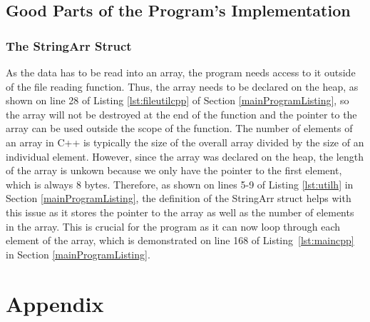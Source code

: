 \documentclass[letterpaper, 10pt,DIV=13]{scrartcl}
\numberwithin{equation}{section} %
\numberwithin{figure}{section} %
\numberwithin{table}{section} %
\begin{document}
\subsection{Good Parts of the Program's Implementation}
\subsubsection{The StringArr Struct}
As the data has to be read into an array, the program needs access to it outside of the file reading function. Thus, the array needs to be declared on the heap, as shown on line 28 of Listing \ref{lst:fileutilcpp} of Section \ref{mainProgramListing}, so the array will not be destroyed at the end of the function and the pointer to the array can be used outside the scope of the function. The number of elements of an array in C++ is typically the size of the overall array divided by the size of an individual element. However, since the array was declared on the heap, the length of the array is unkown because we only have the pointer to the first element, which is always 8 bytes. Therefore, as shown on lines 5-9 of Listing \ref{lst:utilh} in Section \ref{mainProgramListing}, the definition of the StringArr struct helps with this issue as it stores the pointer to the array as well as the number of elements in the array. This is crucial for the program as it can now loop through each element of the array, which is demonstrated on line 168 of Listing~\ref{lst:maincpp} in Section \ref{mainProgramListing}.

\section{Appendix}
\lstset{numbers=left, numberstyle=\tiny, stepnumber=1, numbersep=5pt}

\end{document}

